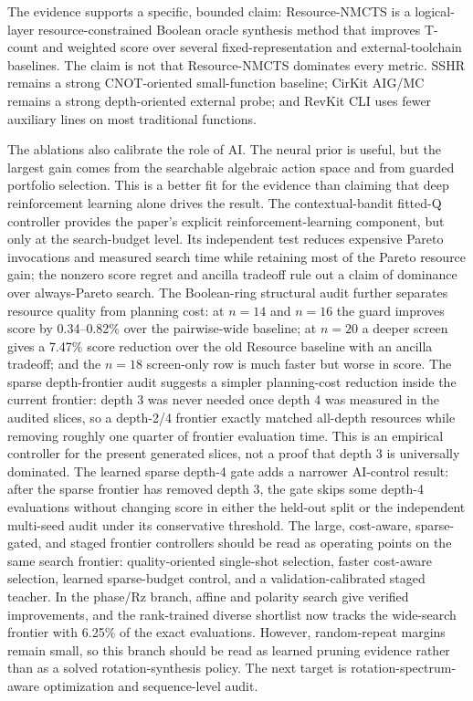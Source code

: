 \documentclass[11pt]{article}
\newcommand{\method}{Resource-NMCTS}
\begin{document}
The evidence supports a specific, bounded claim: \method{} is a logical-layer
resource-constrained Boolean oracle synthesis method that improves T-count and
weighted score over several fixed-representation and external-toolchain
baselines.  The claim is not that \method{} dominates every metric.  SSHR
remains a strong CNOT-oriented small-function baseline; CirKit AIG/MC remains a
strong depth-oriented external probe; and RevKit CLI uses fewer auxiliary lines
on most traditional functions.

The ablations also calibrate the role of AI.  The neural prior is useful, but
the largest gain comes from the searchable algebraic action space and from
guarded portfolio selection.  This is a better fit for the evidence than
claiming that deep reinforcement learning alone drives the result.  The
contextual-bandit fitted-Q controller provides the paper's explicit
reinforcement-learning component, but only at the search-budget level.  Its
independent test reduces expensive Pareto invocations and measured search time
while retaining most of the Pareto resource gain; the nonzero score regret and
ancilla tradeoff rule out a claim of dominance over always-Pareto search.  The
Boolean-ring structural audit further separates resource quality from planning
cost: at $n=14$ and $n=16$ the guard improves score by 0.34--0.82\% over the
pairwise-wide baseline; at $n=20$ a deeper screen gives a 7.47\% score
reduction over the old Resource baseline with an ancilla tradeoff; and the
$n=18$ screen-only row is much faster but worse in score.  The sparse
depth-frontier audit suggests a simpler planning-cost reduction inside the
current frontier: depth 3 was never needed once depth 4 was measured in the
audited slices, so a depth-2/4 frontier exactly matched all-depth resources
while removing roughly one quarter of frontier evaluation time.  This is an
empirical controller for the present generated slices, not a proof that depth 3
is universally dominated.  The learned sparse depth-4 gate adds a narrower
AI-control result: after the sparse frontier has removed depth 3, the gate
skips some depth-4 evaluations without changing score in either the held-out
split or the independent multi-seed audit under its conservative threshold.
The large, cost-aware, sparse-gated, and staged frontier controllers should be
read as operating points on the same search frontier: quality-oriented
single-shot selection, faster cost-aware selection, learned sparse-budget
control, and a validation-calibrated staged teacher.  In the
phase/Rz branch, affine and polarity search give verified improvements, and the
rank-trained diverse shortlist now tracks the wide-search frontier with 6.25\%
of the exact evaluations.  However, random-repeat margins remain small, so this
branch should be read as learned pruning evidence rather than as a solved
rotation-synthesis policy.  The next target is rotation-spectrum-aware
optimization and sequence-level audit.
\end{document}
